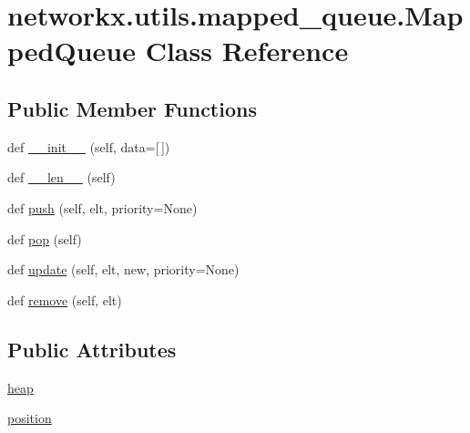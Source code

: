 \hypertarget{classnetworkx_1_1utils_1_1mapped__queue_1_1MappedQueue}{}\section{networkx.\+utils.\+mapped\+\_\+queue.\+Mapped\+Queue Class Reference}
\label{classnetworkx_1_1utils_1_1mapped__queue_1_1MappedQueue}
\subsection*{Public Member Functions}
\begin{DoxyCompactItemize}
\item 
def \hyperlink{classnetworkx_1_1utils_1_1mapped__queue_1_1MappedQueue_a82eb90efb8f6df3a3fcf56c0ec624fbf}{\+\_\+\+\_\+init\+\_\+\+\_\+} (self, data=\mbox{[}$\,$\mbox{]})
\item 
def \hyperlink{classnetworkx_1_1utils_1_1mapped__queue_1_1MappedQueue_af3a1c842bd87c4685654569c9d7b4b60}{\+\_\+\+\_\+len\+\_\+\+\_\+} (self)
\item 
def \hyperlink{classnetworkx_1_1utils_1_1mapped__queue_1_1MappedQueue_a33447b47368614cd50a5a7ef012b8193}{push} (self, elt, priority=None)
\item 
def \hyperlink{classnetworkx_1_1utils_1_1mapped__queue_1_1MappedQueue_aacbab4958fb6ebbb42e6dcd067a1b710}{pop} (self)
\item 
def \hyperlink{classnetworkx_1_1utils_1_1mapped__queue_1_1MappedQueue_abbc8bc9a572274ac074fdfc083a9d5ae}{update} (self, elt, new, priority=None)
\item 
def \hyperlink{classnetworkx_1_1utils_1_1mapped__queue_1_1MappedQueue_a3ef740aed764281890fb279c9ee94319}{remove} (self, elt)
\end{DoxyCompactItemize}
\subsection*{Public Attributes}
\begin{DoxyCompactItemize}
\item 
\hyperlink{classnetworkx_1_1utils_1_1mapped__queue_1_1MappedQueue_a5e69d5429975883c434259a18f8926c2}{heap}
\item 
\hyperlink{classnetworkx_1_1utils_1_1mapped__queue_1_1MappedQueue_a9bedb9446f5b4e2ad2b503af99aa585b}{position}
\end{DoxyCompactItemize}


